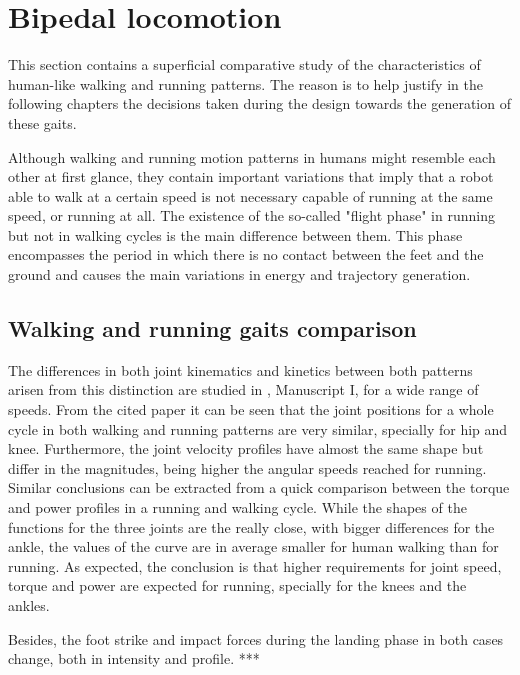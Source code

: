 
\section{Bipedal locomotion} %
\label{sec:bipedal_walking_and_running_gaits}
This section contains a superficial comparative study of the characteristics of human-like walking and running patterns.
The reason is to help justify in the following chapters the decisions taken during the design towards the generation of these gaits.

Although walking and running motion patterns in humans might resemble each other at first glance, they contain important variations that imply that a robot able to walk at a certain speed is not necessary capable of running at the same speed, or running at all.
The existence of the so-called "flight phase" in running but not in walking cycles is the main difference between them.
This phase encompasses the period in which there is no contact between the feet and the ground and causes the main variations in energy and trajectory generation.

\subsection{Walking and running gaits comparison} %
\label{sub:walk_and_run_comparison}
The differences in both joint kinematics and kinetics between both patterns arisen from this distinction are studied in \cite{grimmer}, Manuscript I, for a wide range of speeds.
From the cited paper it can be seen that the joint positions for a whole cycle in both walking and running patterns are very similar, specially for hip and knee.
Furthermore, the joint velocity profiles have almost the same shape but differ in the magnitudes, being higher the angular speeds reached for running.
Similar conclusions can be extracted from a quick comparison between the torque and power profiles in a running and walking cycle.
While the shapes of the functions for the three joints are the really close, with bigger differences for the ankle, the values of the curve are in average smaller for human walking than for running.
As expected, the conclusion is that higher requirements for joint speed, torque and power are expected for running, specially for the knees and the ankles.

Besides, the foot strike and impact forces during the landing phase in both cases change, both in intensity and profile. *** 


